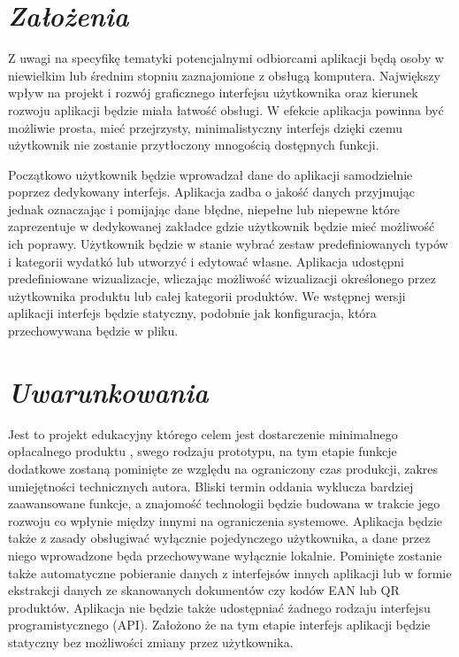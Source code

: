 \documentclass[a4paper,10pt, twoside]{report}
\newcommand{\customstylesection}[1]{\textbf{\textit{#1}}}
\begin{document}
\section{\customstylesection{Założenia}}
{Z uwagi na specyfikę tematyki potencjalnymi odbiorcami aplikacji będą osoby 
w niewielkim lub średnim stopniu zaznajomione z obsługą komputera. Największy
wpływ na projekt i rozwój graficznego interfejsu użytkownika oraz kierunek
 rozwoju aplikacji będzie miała łatwość obsługi. W efekcie aplikacja powinna
 być możliwie prosta, mieć przejrzysty, minimalistyczny interfejs dzięki 
czemu użytkownik nie zostanie przytłoczony mnogością dostępnych funkcji.}

{Początkowo użytkownik będzie wprowadzał dane do aplikacji samodzielnie poprzez 
dedykowany interfejs. Aplikacja zadba o jakość danych przyjmując jednak 
oznaczając i pomijając dane błędne, niepełne lub niepewne które zaprezentuje w 
dedykowanej zakładce gdzie użytkownik będzie mieć możliwość ich poprawy. 
Użytkownik będzie w stanie wybrać zestaw predefiniowanych typów i kategorii 
wydatkó lub utworzyć i edytować własne. Aplikacja udostępni predefiniowane 
wizualizacje, wliczając możliwość wizualizacji określonego przez użytkownika 
produktu lub całej kategorii produktów. We wstępnej wersji aplikacji interfejs
będzie statyczny, podobnie jak konfiguracja, która przechowywana będzie w pliku.}

\section{\customstylesection{Uwarunkowania}}
{Jest to projekt edukacyjny którego celem jest dostarczenie minimalnego
 opłacalnego produktu \cite{MVP}, swego rodzaju prototypu, na tym etapie funkcje
 dodatkowe zostaną pominięte ze względu na ograniczony czas produkcji, zakres
 umiejętności technicznych autora. Bliski termin oddania wyklucza bardziej
 zaawansowane funkcje, a znajomość technologii będzie budowana w trakcie jego
 rozwoju co wpłynie między innymi na ograniczenia systemowe. Aplikacja będzie
 także z zasady obsługiwać wyłącznie pojedynczego użytkownika, a dane przez
 niego wprowadzone będa przechowywane wyłącznie lokalnie. Pominięte zostanie
 także automatyczne pobieranie danych z interfejsów innych aplikacji lub w
 formie ekstrakcji danych ze skanowanych dokumentów czy kodów EAN lub QR
 produktów. Aplikacja nie będzie także udostępniać żadnego rodzaju interfejsu 
programistycznego (API). Założono że na tym etapie interfejs aplikacji będzie statyczny bez
 możliwości zmiany przez użytkownika.}
\end{document}
